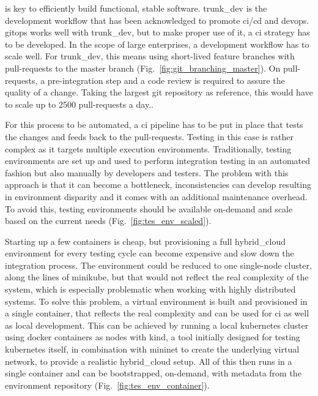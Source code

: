 \documentclass[../main.tex]{subfiles}
\begin{document}
     is key to efficiently build functional, stable software.
    \Gls{trunk_dev} is the development workflow that has been acknowledged to promote \acrshort{ci}/\acrshort{cd} and \gls{devops}.
    \gls{gitops} works well with \gls{trunk_dev}, but to make proper use of it, a \acrshort{ci} strategy has to be developed.
    In the scope of large enterprises, a development workflow has to scale well.
    For \gls{trunk_dev}, this means using short-lived feature branches with pull-requests to the master branch (Fig.~\ref{fig:git_branching_master}).
    On pull-requests, a pre-integration step and a code review is required to assure the quality of a change.
    Taking the largest \gls{git} repository as reference, this would have to scale up to 2500 pull-requests a day.\cite{trunk_based_dev,largest_git_repo}.

    

    For this process to be automated, a \acrshort{ci} pipeline has to be put in place that tests the changes and feeds back to the pull-requests.
    Testing in this case is rather complex as it targets multiple execution environments.
    Traditionally, testing environments are set up and used to perform integration testing in an automated fashion but also manually by developers and testers.
    The problem with this approach is that it can become a bottleneck, inconsistencies can develop resulting in environment disparity and it comes with an additional maintenance overhead.
    To avoid this, testing environments should be available on-demand and scale based on the current needs (Fig.~\ref{fig:tes_env_scaled}).

    

    Starting up a few containers is cheap, but provisioning a full \gls{hybrid_cloud} environment for every testing cycle can become expensive and slow down the integration process.
    The environment could be reduced to one single-node cluster, along the lines of \gls{minikube}, but that would not reflect the real complexity of the system, which is especially problematic when working with highly distributed systems.
    To solve this problem, a virtual environment is built and provisioned in a single container, that reflects the real complexity and can be used for \acrshort{ci} as well as local development.
    This can be achieved by running a local \gls{kubernetes} cluster using \gls{docker} containers as nodes with \gls{kind}, a tool initially designed for testing \gls{kubernetes} itself\cite{kind_k8s_in_docker}, in combination with \gls{mininet} to create the underlying virtual network\cite{mininet}, to provide a realistic \gls{hybrid_cloud} setup.
    All of this then runs in a single container and can be bootstrapped, on-demand, with metadata from the environment repository (Fig.~\ref{fig:tes_env_container}).
\end{document}
